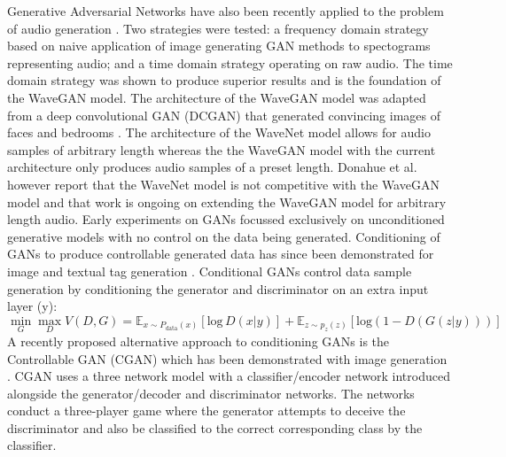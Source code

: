 \documentclass[a4paper, dvipsnames, titlepage]{article}
\begin{document}
\newline
\newline
Generative Adversarial Networks have also been recently applied to the problem of audio generation \citep{2018arXiv180204208D}.
Two strategies were tested: a frequency domain strategy based on naive application of image generating GAN methods to spectograms representing audio; and a time domain strategy operating on raw audio.
The time domain strategy was shown to produce superior results and is the foundation of the WaveGAN model.
The architecture of the WaveGAN model was adapted from a deep convolutional GAN (DCGAN) that generated convincing images of faces and bedrooms \citep{2015arXiv151106434R}.
\newline
\newline
The architecture of the WaveNet model allows for audio samples of arbitrary length whereas the the WaveGAN model with the current architecture only produces audio samples of a preset length.
Donahue et al. however report that the WaveNet model is not competitive with the WaveGAN model and that work is ongoing on extending the WaveGAN model for arbitrary length audio.
\newline
\newline
Early experiments on GANs focussed exclusively on unconditioned generative models with no control on the data being generated.
Conditioning of GANs to produce controllable generated data has since been demonstrated for image and textual tag generation \citep{2014arXiv1411.1784M}.
Conditional GANs control data sample generation by conditioning the generator and discriminator on an extra input layer (y):
\begin{equation}
  \min_{G} \max_{D} V(D,G) = \mathbb{E}_{x \sim P_\mathrm{data}(x)}[\mathrm{log}\,D(x|y)] + \mathbb{E}_{z \sim p_z(z)}[\mathrm{log} (1 - D(G(z|y)))]
\end{equation}
\newline
\newline
A recently proposed alternative approach to conditioning GANs is the Controllable GAN (CGAN) which has been demonstrated with image generation \citep{2017arXiv170800598L}.
CGAN uses a three network model with a classifier/encoder network introduced alongside the generator/decoder and discriminator networks.
The networks conduct a three-player game where the generator attempts to deceive the discriminator and also be classified to the correct corresponding class by the classifier.

\newpage
\end{document}
